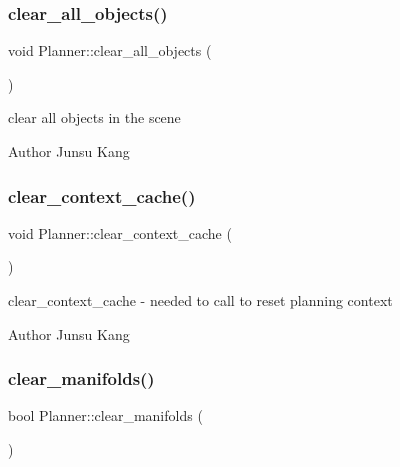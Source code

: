 \subsubsection{\texorpdfstring{clear\+\_\+all\+\_\+objects()}{clear\_all\_objects()}}
{\footnotesize\ttfamily void Planner\+::clear\+\_\+all\+\_\+objects (\begin{DoxyParamCaption}{ }\end{DoxyParamCaption})}



clear all objects in the scene 

\begin{DoxyAuthor}{Author}
Junsu Kang 
\end{DoxyAuthor}
\mbox{\label{class_r_n_b_1_1_moveit_compact_1_1_planner_a34aebe9c8aff383648865d359ca113dc}} 
\subsubsection{\texorpdfstring{clear\+\_\+context\+\_\+cache()}{clear\_context\_cache()}}
{\footnotesize\ttfamily void Planner\+::clear\+\_\+context\+\_\+cache (\begin{DoxyParamCaption}{ }\end{DoxyParamCaption})}



clear\+\_\+context\+\_\+cache -\/ needed to call to reset planning context 

\begin{DoxyAuthor}{Author}
Junsu Kang 
\end{DoxyAuthor}
\mbox{\label{class_r_n_b_1_1_moveit_compact_1_1_planner_aac7f1dd0ef403cf9dfaa81de8a355cbe}} 
\subsubsection{\texorpdfstring{clear\+\_\+manifolds()}{clear\_manifolds()}}
{\footnotesize\ttfamily bool Planner\+::clear\+\_\+manifolds (\begin{DoxyParamCaption}{ }\end{DoxyParamCaption})}



